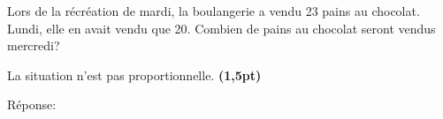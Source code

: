 
\question[2]
Lors de la récréation de mardi, la boulangerie a vendu 23 pains au chocolat. Lundi, elle en avait vendu que 20. Combien de pains au chocolat seront vendus mercredi?

\vspace{10pt}{\footnotesize\raggedleft Espace pour ta démarche et tes calculs\par}
\begin{solutionorgrid}[140pt]
La situation n'est pas proportionnelle.  \textbf{(1,5pt)}
\end{solutionorgrid}

\begin{tcolorbox}[enhanced jigsaw, interior hidden, colframe=box, parbox=false]%
Réponse: 
\end{tcolorbox}




